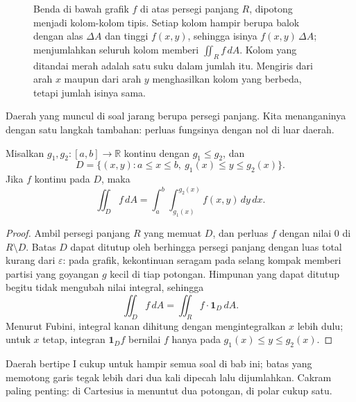 \begin{figure}[htbp]
\caption{Benda di bawah grafik $f$ di atas persegi panjang $R$, dipotong menjadi
kolom-kolom tipis. Setiap kolom hampir berupa balok dengan alas $\Delta A$ dan tinggi
$f(x,y)$, sehingga isinya $f(x,y)\,\Delta A$; menjumlahkan seluruh kolom memberi
$\iint_R f\,dA$. Kolom yang ditandai merah adalah satu suku dalam jumlah itu.
Mengiris dari arah $x$ maupun dari arah $y$ menghasilkan kolom yang berbeda, tetapi
jumlah isinya sama.}
\label{fig:kolom-tipis}
\end{figure}

Daerah yang muncul di soal jarang berupa persegi panjang. Kita menanganinya
dengan satu langkah tambahan: perluas fungsinya dengan nol di luar daerah.

\begin{lemma}
Misalkan $g_{1},g_{2}\colon[a,b]\to\mathbb{R}$ kontinu dengan $g_{1}\le
g_{2}$, dan
\[
D=\{(x,y): a\le x\le b,\ g_{1}(x)\le y\le g_{2}(x)\}.
\]
Jika $f$ kontinu pada $D$, maka
\[
\iint_{D}f\,dA=\int_{a}^{b}\!\!\int_{g_{1}(x)}^{g_{2}(x)}f(x,y)\,dy\,dx .
\]
\end{lemma}

\begin{proof}
Ambil persegi panjang $R$ yang memuat $D$, dan perluas $f$ dengan nilai $0$ di
$R\setminus D$. Batas $D$ dapat ditutup oleh berhingga persegi panjang dengan
luas total kurang dari $\varepsilon$: pada grafik, kekontinuan seragam pada
selang kompak memberi partisi yang goyangan $g$ kecil di tiap potongan.
Himpunan yang dapat ditutup begitu tidak mengubah nilai integral, sehingga
\[
\iint_{D}f\,dA=\iint_{R} f\cdot\mathbf{1}_{D}\,dA .
\]
Menurut Fubini, integral kanan dihitung dengan mengintegralkan $x$ lebih dulu;
untuk $x$ tetap, integran $\mathbf{1}_{D}f$ bernilai $f$ hanya pada
$g_{1}(x)\le y\le g_{2}(x)$.
\end{proof}

Daerah bertipe I cukup untuk hampir semua soal di bab ini; batas yang memotong
garis tegak lebih dari dua kali dipecah lalu dijumlahkan. Cakram paling penting:
di Cartesius ia menuntut dua potongan, di polar cukup satu.

